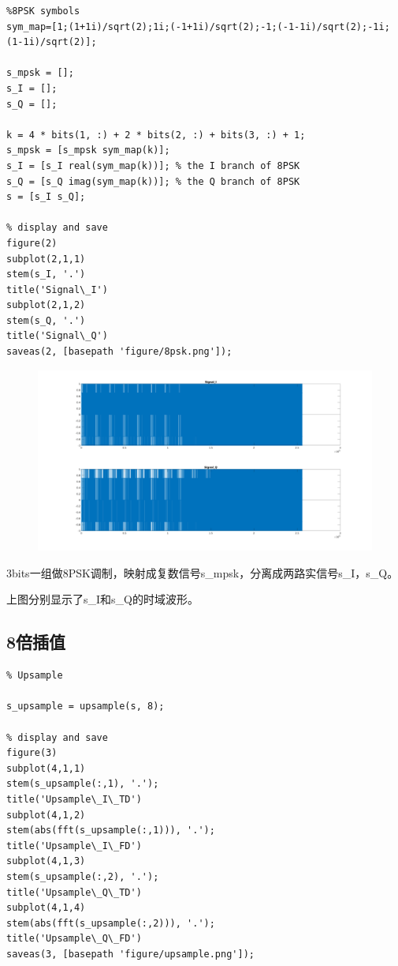 \begin{spacing}{1.5}
\begin{lstlisting}
%8PSK symbols
sym_map=[1;(1+1i)/sqrt(2);1i;(-1+1i)/sqrt(2);-1;(-1-1i)/sqrt(2);-1i;(1-1i)/sqrt(2)]; 

s_mpsk = [];
s_I = [];
s_Q = [];

k = 4 * bits(1, :) + 2 * bits(2, :) + bits(3, :) + 1;
s_mpsk = [s_mpsk sym_map(k)];
s_I = [s_I real(sym_map(k))]; % the I branch of 8PSK
s_Q = [s_Q imag(sym_map(k))]; % the Q branch of 8PSK
s = [s_I s_Q];

% display and save
figure(2)
subplot(2,1,1)
stem(s_I, '.')
title('Signal\_I')
subplot(2,1,2)
stem(s_Q, '.')
title('Signal\_Q')
saveas(2, [basepath 'figure/8psk.png']);
\end{lstlisting}

\begin{figure}[H]
\centering
\includegraphics[width = \columnwidth]{8psk.png}
\end{figure}

3bits一组做8PSK调制，映射成复数信号s\_mpsk，分离成两路实信号s\_I，s\_Q。

上图分别显示了s\_I和s\_Q的时域波形。

\subsection{8倍插值}

\begin{lstlisting}
% Upsample

s_upsample = upsample(s, 8);

% display and save
figure(3)
subplot(4,1,1)
stem(s_upsample(:,1), '.');
title('Upsample\_I\_TD')
subplot(4,1,2)
stem(abs(fft(s_upsample(:,1))), '.');
title('Upsample\_I\_FD')
subplot(4,1,3)
stem(s_upsample(:,2), '.');
title('Upsample\_Q\_TD')
subplot(4,1,4)
stem(abs(fft(s_upsample(:,2))), '.');
title('Upsample\_Q\_FD')
saveas(3, [basepath 'figure/upsample.png']);
\end{lstlisting}


\end{spacing}
